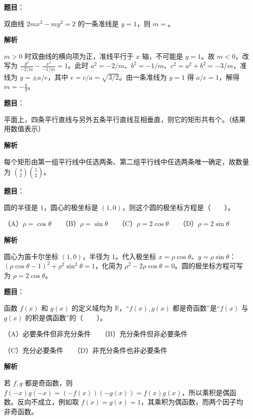 \begin{answer}

\textbf{题目}：

双曲线 $2mx^2-my^2=2$ 的一条准线是 $y=1$，则 $m=$\gkblank{}。

\textbf{解析}

$m>0$ 时双曲线的横向项为正，准线平行于 $x$ 轴，不可能是 $y=1$。故 $m<0$，改写为 $\frac{y^2}{-2/m}-\frac{x^2}{-1/m}=1$。此时 $a^2=-2/m$、$b^2=-1/m$、$c^2=a^2+b^2=-3/m$，准线为 $y=\pm a/e$，其中 $e=c/a=\sqrt{3/2}$。由一条准线为 $y=1$ 得 $a/e=1$，解得 $m=-\frac43$。


\end{answer}
\begin{answer}

\textbf{题目}：

平面上，四条平行直线与另外五条平行直线互相垂直，则它的矩形共有\gkblank{}个。（结果用数值表示）

\textbf{解析}

每个矩形由第一组平行线中任选两条、第二组平行线中任选两条唯一确定，故数量为 $\binom42\binom52$。


\end{answer}
\begin{answer}

\textbf{题目}：

圆的半径是 $1$，圆心的极坐标是 $(1,0)$，则这个圆的极坐标方程是\mbox{（　　）}。

（A）$\rho=\cos\theta$　　（B）$\rho=\sin\theta$　　（C）$\rho=2\cos\theta$　　（D）$\rho=2\sin\theta$

\textbf{解析}

圆心为笛卡尔坐标 $(1,0)$，半径为 $1$。代入极坐标 $x=\rho\cos\theta$、$y=\rho\sin\theta$：$(\rho\cos\theta-1)^2+\rho^2\sin^2\theta=1$，化简为 $\rho^2-2\rho\cos\theta=0$。圆的极坐标方程可写为 $\rho=2\cos\theta$。


\end{answer}
\begin{answer}

\textbf{题目}：

函数 $f(x)$ 和 $g(x)$ 的定义域均为 $\mathbb R$，“$f(x),g(x)$ 都是奇函数”是“$f(x)$ 与 $g(x)$ 的积是偶函数”的\mbox{（　　）}。

（A）必要条件但非充分条件　　（B）充分条件但非必要条件

（C）充分必要条件　　（D）非充分条件也非必要条件

\textbf{解析}

若 $f,g$ 都是奇函数，则 $f(-x)g(-x)=(-f(x))(-g(x))=f(x)g(x)$，所以乘积是偶函数。反向不成立，例如取 $f(x)=g(x)=1$，其乘积为偶函数，而两个因子均非奇函数。


\end{answer}
